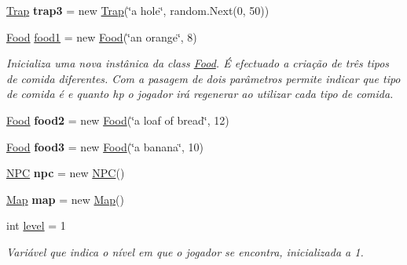 \begin{DoxyCompactItemize}
\mbox{\hyperlink{class_projeto2___l_p1_1_1_trap}{Trap}} {\bfseries trap3} = new \mbox{\hyperlink{class_projeto2___l_p1_1_1_trap}{Trap}}(\char`\"{}a hole\char`\"{}, random.\+Next(0, 50))
\item 
\mbox{\hyperlink{class_projeto2___l_p1_1_1_food}{Food}} \mbox{\hyperlink{class_projeto2___l_p1_1_1_initializer_a16290d59b95ab29b69212538a9cb2300}{food1}} = new \mbox{\hyperlink{class_projeto2___l_p1_1_1_food}{Food}}(\char`\"{}an orange\char`\"{}, 8)
\begin{DoxyCompactList}\small\item\em Inicializa uma nova instânica da class \mbox{\hyperlink{class_projeto2___l_p1_1_1_food}{Food}}. É efectuado a criação de três tipos de comida diferentes. Com a pasagem de dois parâmetros permite indicar que tipo de comida é e quanto hp o jogador irá regenerar ao utilizar cada tipo de comida. \end{DoxyCompactList}\item 
\mbox{\label{class_projeto2___l_p1_1_1_initializer_a2c44828e89c6adbd763eacaa96729337}} 
\mbox{\hyperlink{class_projeto2___l_p1_1_1_food}{Food}} {\bfseries food2} = new \mbox{\hyperlink{class_projeto2___l_p1_1_1_food}{Food}}(\char`\"{}a loaf of bread\char`\"{}, 12)
\item 
\mbox{\label{class_projeto2___l_p1_1_1_initializer_aa7b3aead1c087d3ebf2df6e9a1e63175}} 
\mbox{\hyperlink{class_projeto2___l_p1_1_1_food}{Food}} {\bfseries food3} = new \mbox{\hyperlink{class_projeto2___l_p1_1_1_food}{Food}}(\char`\"{}a banana\char`\"{}, 10)
\item 
\mbox{\label{class_projeto2___l_p1_1_1_initializer_af48218039367457b95d0d68a9fd73aa4}} 
\mbox{\hyperlink{class_projeto2___l_p1_1_1_n_p_c}{N\+PC}} {\bfseries npc} = new \mbox{\hyperlink{class_projeto2___l_p1_1_1_n_p_c}{N\+PC}}()
\item 
\mbox{\label{class_projeto2___l_p1_1_1_initializer_aeff550ae7b153cdd35faeedcf5e63ab6}} 
\mbox{\hyperlink{class_projeto2___l_p1_1_1_map}{Map}} {\bfseries map} = new \mbox{\hyperlink{class_projeto2___l_p1_1_1_map}{Map}}()
\item 
int \mbox{\hyperlink{class_projeto2___l_p1_1_1_initializer_a4797e0983bdfd34077033ad34a865208}{level}} = 1
\begin{DoxyCompactList}\small\item\em Variável que indica o nível em que o jogador se encontra, inicializada a 1. \end{DoxyCompactList}\end{DoxyCompactItemize}


